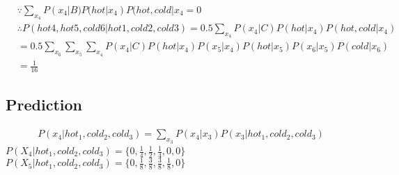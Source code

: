 \documentclass[12pt]{amsart}
\begin{document}
\begin{align*}
&\because   \sum_{x_4} P(x_4| B)P(hot|x_4)P(hot, cold|x_{4} = 0 \\
&\therefore  P(hot4, hot5, cold6 | hot1, cold2, cold3) = 0.5 \sum_{x_4} P(x_4| C)P(hot|x_4)P(hot, cold |x_{4}) \\
	& =0.5 \sum_{x_6}\sum_{x_5}\sum_{x_4} P(x_4| C)P(hot|x_4) P(x_5|x_4) P(hot|x_5) P(x_6|x_5) P(cold|x_6)\\
	&= \frac{1}{16}
\end{align*}

\subsection*{Prediction}
\begin{align*}
P(x_4 | hot_1, cold_2, cold_3) = \sum_{x_3}P(x_4| x_3) P(x_3 | hot_1, cold_2, cold_3)
\end{align*}
$P(X_4 | hot_1, cold_2, cold_3) = \{0, \frac{1}{4}, \frac{1}{2}, \frac{1}{4}, 0, 0  \}$ \\
$P(X_5 | hot_1, cold_2, cold_3) = \{0, \frac{1}{8}, \frac{3}{8}, \frac{3}{8}, \frac{1}{8}, 0  \}$
\end{document}
